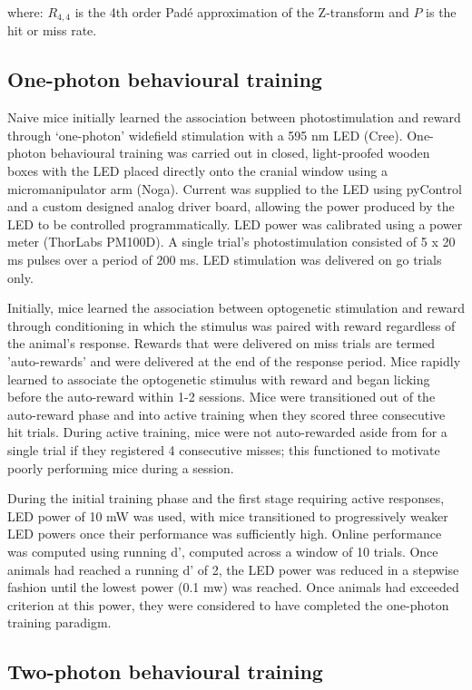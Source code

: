 where: $R_{4,4}$ is the 4th order Pad\'e approximation of the Z-transform and $P$ is the hit or miss rate.

\subsection{One-photon behavioural training}

Naive mice initially learned the association between photostimulation and reward through ‘one-photon’ widefield stimulation with a 595 nm LED (Cree). One-photon behavioural training was carried out in closed, light-proofed wooden boxes with the LED placed directly onto the cranial window using a micromanipulator arm (Noga). Current was supplied to the LED using pyControl and a custom designed analog driver board, allowing the power produced by the LED to be controlled programmatically. LED power was calibrated using a power meter (ThorLabs PM100D). A single trial's photostimulation consisted of 5 x 20 ms pulses over a period of 200 ms. LED stimulation was delivered on go trials only.

Initially, mice learned the association between optogenetic stimulation and reward through conditioning in which the stimulus was paired with reward regardless of the animal's response. Rewards that were delivered on miss trials are termed 'auto-rewards' and were delivered at the end of the response period. Mice rapidly learned to associate the optogenetic stimulus with reward and began licking before the auto-reward within 1-2 sessions. Mice were transitioned out of the auto-reward phase and into active training when they scored three consecutive hit trials. During active training, mice were not auto-rewarded aside from for a single trial if they registered 4 consecutive misses; this functioned to motivate poorly performing mice during a session.

During the initial training phase and the first stage requiring active responses,  LED power of 10 mW was used, with mice transitioned to progressively weaker LED powers once their performance was sufficiently high. Online performance was computed using running d', computed across a window of 10 trials. Once animals had reached a running d' of 2, the LED power was reduced in a stepwise fashion until the lowest power (0.1 mw) was reached. Once animals had exceeded criterion at this power, they were considered to have completed the one-photon training paradigm.

\subsection{Two-photon behavioural training}

